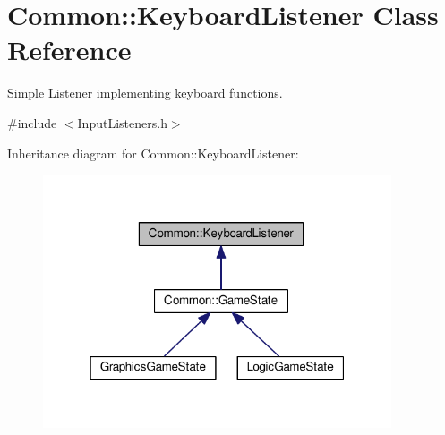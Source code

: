 \hypertarget{class_common_1_1_keyboard_listener}{}\section{Common\+:\+:Keyboard\+Listener Class Reference}
\label{class_common_1_1_keyboard_listener}


Simple Listener implementing keyboard functions.  




{\ttfamily \#include $<$Input\+Listeners.\+h$>$}



Inheritance diagram for Common\+:\+:Keyboard\+Listener\+:\nopagebreak
\begin{figure}[H]
\begin{center}
\leavevmode
\includegraphics[width=292pt]{class_common_1_1_keyboard_listener__inherit__graph}
\end{center}
\end{figure}
